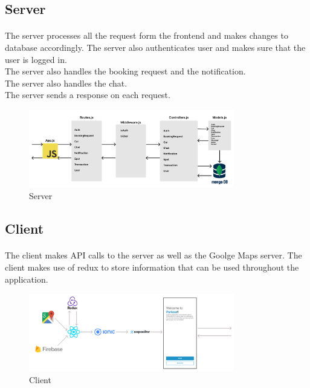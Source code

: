         \pagebreak

        \subsection{Server}
        \paragraph*{}
            The server processes all the request form the frontend and makes changes to database accordingly.
            The server also authenticates user and makes sure that the user is logged in.\\
            The server also handles the booking request and the notification.\\
            The server also handles the chat.\\
            The server sends a response on each request.

            \begin{figure}[h]
                \centering
                \includegraphics[width=0.8\textwidth]{images/server.png}
                \caption{Server}
                \label{fig:server}
            \end{figure}


            \pagebreak

            \subsection{Client}
            \paragraph*{}
                The client makes API calls to the server as well as the Goolge Maps server. The client makes use of redux to store information that can be used throughout the application.\\
    
                \begin{figure}[h]
                    \centering
                    \includegraphics[width=0.8\textwidth]{images/FE_Architecture.png}
                    \caption{Client}
                    \label{fig:FE_Architecture}
                \end{figure}



